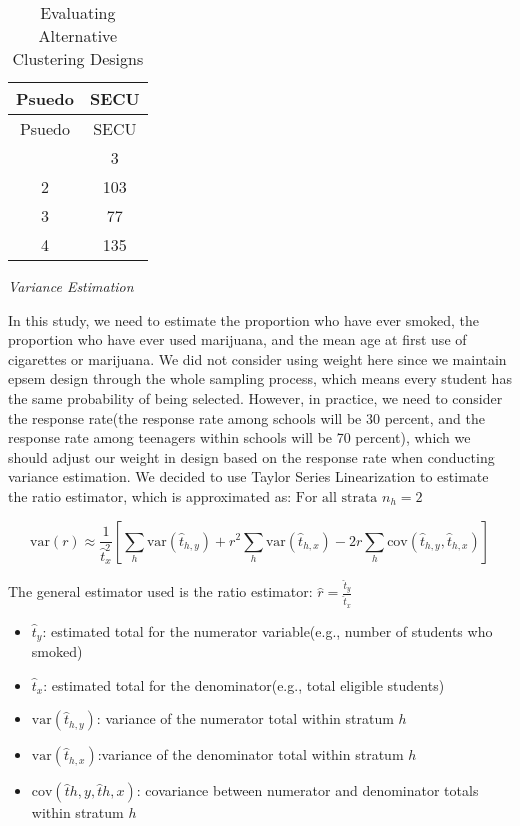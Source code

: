 \documentclass[
  12pt]{article}
\begin{document}
\begin{longtable}[]{@{}cc@{}}
\caption{Evaluating Alternative Clustering Designs}\tabularnewline
\toprule\noalign{}
Psuedo & SECU \\
\midrule\noalign{}
\endfirsthead
\toprule\noalign{}
Psuedo & SECU \\
\midrule\noalign{}
\endhead
\bottomrule\noalign{}
\endlastfoot
1 & 3 \\
2 & 103 \\
3 & 77 \\
4 & 135 \\
\end{longtable}

\emph{Variance Estimation}

In this study, we need to estimate the proportion who have ever smoked,
the proportion who have ever used marijuana, and the mean age at first
use of cigarettes or marijuana. We did not consider using weight here
since we maintain epsem design through the whole sampling process, which
means every student has the same probability of being selected. However,
in practice, we need to consider the response rate(the response rate
among schools will be 30 percent, and the response rate among teenagers
within schools will be 70 percent), which we should adjust our weight in
design based on the response rate when conducting variance estimation.
We decided to use Taylor Series Linearization to estimate the ratio
estimator, which is approximated as: \(\text{For all strata } n_h = 2\)

\[
\text{var}(r) \approx \frac{1}{\hat{t}_x^2} \left[ \sum_h \text{var}(\hat{t}_{h,y}) + r^2 \sum_h \text{var}(\hat{t}_{h,x}) - 2r \sum_h \text{cov}(\hat{t}_{h,y}, \hat{t}_{h,x}) \right]
\]

The general estimator used is the ratio estimator:
\(\hat{r} = \frac{\hat{t}_y}{\hat{t}_x}\)

\begin{itemize}
\item
  \(\hat{t}_y\): estimated total for the numerator variable(e.g., number
  of students who smoked)
\item
  \(\hat{t}_x\): estimated total for the denominator(e.g., total
  eligible students)
\item
  \(\text{var}(\hat{t}_{h,y})\): variance of the numerator total within
  stratum \(h\)
\item
  \(\text{var}(\hat{t}_{h,x})\):variance of the denominator total within
  stratum \(h\)
\item
  \(\text{cov}(\hat{t}{h,y}, \hat{t}{h,x})\): covariance between
  numerator and denominator totals within stratum \(h\)
\end{itemize}
\end{document}
